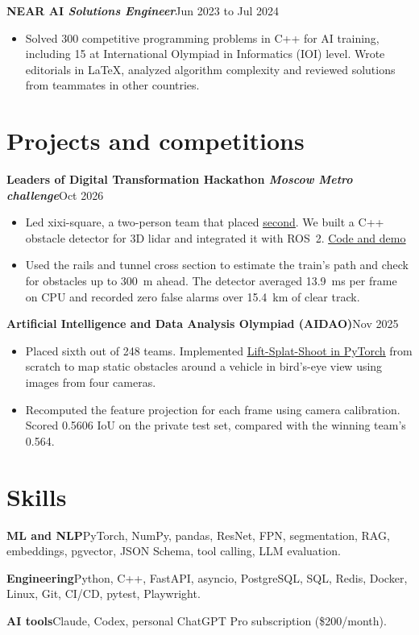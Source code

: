 \documentclass[10pt,a4paper]{article}
\newcommand{\role}[2]{\textbf{#1}\hfill{\small #2}\par}
\begin{document}
\vspace{3pt}
\role{NEAR AI \normalfont\enspace\textit{Solutions Engineer}}{Jun 2023 to Jul 2024}
\begin{itemize}
  \item Solved 300 competitive programming problems in C++ for AI training, including 15 at International Olympiad in Informatics (IOI) level. Wrote editorials in LaTeX, analyzed algorithm complexity and reviewed solutions from teammates in other countries.
\end{itemize}

\section{Projects and competitions}
\role{Leaders of Digital Transformation Hackathon \normalfont\enspace\textit{Moscow Metro challenge}}{Oct 2026}
\begin{itemize}
  \item Led xixi-square, a two-person team that placed \href{https://i.moscow/upload/lending/lct2026/edebdf.pdf\#page=5}{\underline{second}}. We built a C++ obstacle detector for 3D lidar and integrated it with ROS~2. \href{https://github.com/iluuua/metro-lidar-obstacle-detection}{\underline{Code and demo}}
  \item Used the rails and tunnel cross section to estimate the train's path and check for obstacles up to 300~m ahead. The detector averaged 13.9~ms per frame on CPU and recorded zero false alarms over 15.4~km of clear track.
\end{itemize}

\vspace{3pt}
\role{Artificial Intelligence and Data Analysis Olympiad (AIDAO)}{Nov 2025}
\begin{itemize}
  \item Placed sixth out of 248 teams. Implemented \href{https://github.com/iluuua/aidao-2025-bev-occupancy}{\underline{Lift-Splat-Shoot in PyTorch}} from scratch to map static obstacles around a vehicle in bird's-eye view using images from four cameras.
  \item Recomputed the feature projection for each frame using camera calibration. Scored 0.5606 IoU on the private test set, compared with the winning team's 0.564.
\end{itemize}

\section{Skills}
\textbf{ML and NLP}\quad PyTorch, NumPy, pandas, ResNet, FPN, segmentation, RAG, embeddings, pgvector, JSON Schema, tool calling, LLM evaluation.\par
\textbf{Engineering}\quad Python, C++, FastAPI, asyncio, PostgreSQL, SQL, Redis, Docker, Linux, Git, CI/CD, pytest, Playwright.\par
\textbf{AI tools}\quad Claude, Codex, personal ChatGPT Pro subscription (\$200/month).
\end{document}
